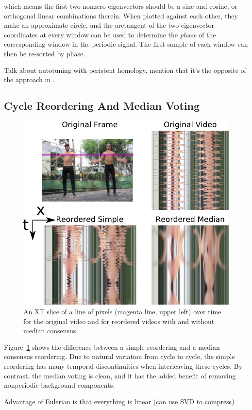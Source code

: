 \documentclass{article}
\begin{document}
which means the first two nonzero eigenvectors should be a sine and cosine, or orthogonal linear combinations therein.  When plotted against each other, they make an approximate circle, and the arctangent of the two eigenvector coordinates at every window can be used to determine the {\em phase} of the corresponding window in the periodic signal.  The first sample of each window can then be re-sorted by phase.

Talk about autotuning with peristent homology, mention that it's the opposite of the approach in \cite{bendich2011improving}.

\subsection{Cycle Reordering And Median Voting}
\label{sec:cyclereordering}

\begin{figure}[h!]
\centering
\includegraphics[width=0.8\columnwidth]{XTSlice.pdf}
\caption{An XT slice of a line of pixels (magenta line, upper left) over time for the original video and for reordered videos with and without median consensus.}
\label{fig:XTSlice}
\end{figure}

Figure~\ref{fig:XTSlice} shows the difference between a simple reordering and a median consensus reordering.  Due to natural variation from cycle to cycle, the simple reordering has many temporal discontinuities when interleaving these cycles.  By contrast, the median voting is clean, and it has the added benefit of removing nonperiodic background components.

Advantage of Eulerian is that everything is linear (can use SVD to compress)
\end{document}

